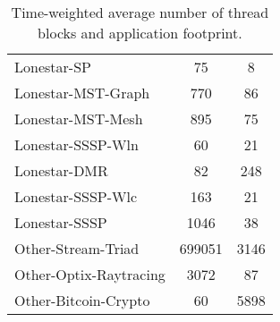 \begin{table}[t]
\begin{small}
\begin{tabular}{lcc}
Lonestar-SP & 75 & 8 \\
Lonestar-MST-Graph & 770 & 86 \\
Lonestar-MST-Mesh & 895 & 75 \\
Lonestar-SSSP-Wln & 60 & 21 \\
Lonestar-DMR  & 82 & 248 \\
Lonestar-SSSP-Wlc  & 163 & 21 \\
Lonestar-SSSP  & 1046 & 38 \\
Other-Stream-Triad  & 699051 & 3146 \\
Other-Optix-Raytracing  & 3072 & 87 \\
Other-Bitcoin-Crypto  & 60 & 5898 \\
\toprule
\end{tabular}
\caption{Time-weighted average number of thread blocks and application footprint.}
\label{tab:numctas}
\vspace{-0.75cm}
\end{small}
\end{table}
